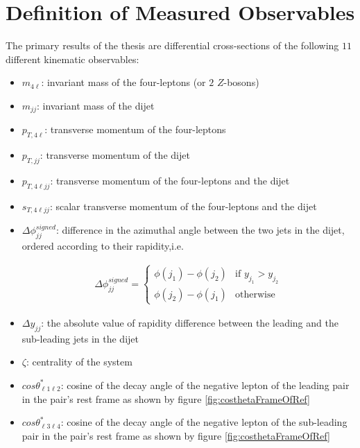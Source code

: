 \section{Definition of Measured Observables}
\label{sec:Obs}

The primary results of the thesis are differential cross-sections of the following $11$ different kinematic observables:

\begin{itemize}

\item{	$m_{4\ell}$: invariant mass of the four-leptons (or $2$ $Z$-bosons)}
\item{ 	$m_{jj}$:  invariant mass of the dijet}
\item{	$p_{T,4\ell}$: transverse momentum of the four-leptons }
\item{	$p_{T, jj}$: transverse momentum of the dijet }
\item{	$p_{T,4\ell jj}$: transverse momentum of the four-leptons and the dijet }
\item{	$s_{T,4\ell jj}$: scalar transverse momentum of the four-leptons and the dijet }
\item{ 	$\Delta \phi _{jj}^{signed}$: difference in the azimuthal angle between the two jets in the dijet, ordered according to their rapidity,i.e. 

\begin{align*}
	\Delta \phi _{jj}^{signed} = 
	\begin{cases}
	\phi(j_1)-\phi(j_2) & \text{if $y_{j_1} > y_{j_2}$}\\
	\phi(j_2)-\phi(j_1) & \text{otherwise}
	\end{cases} 
\end{align*}
}
\item{ $\Delta y_{jj}$: the absolute value of rapidity difference between the leading and the sub-leading jets in the dijet}
\item{ $\zeta$: centrality of the system}
\item{ $cos \theta^{*}_{\ell 1 \ell 2}$: cosine of the decay angle of the negative lepton of the leading pair in the pair's rest frame as shown by figure \ref{fig:costhetaFrameOfRef}}
\item{ $cos \theta^{*}_{\ell 3 \ell 4}$: cosine of the decay angle of the negative lepton of the sub-leading pair in the pair's rest frame as shown by figure \ref{fig:costhetaFrameOfRef} }

\end{itemize}

